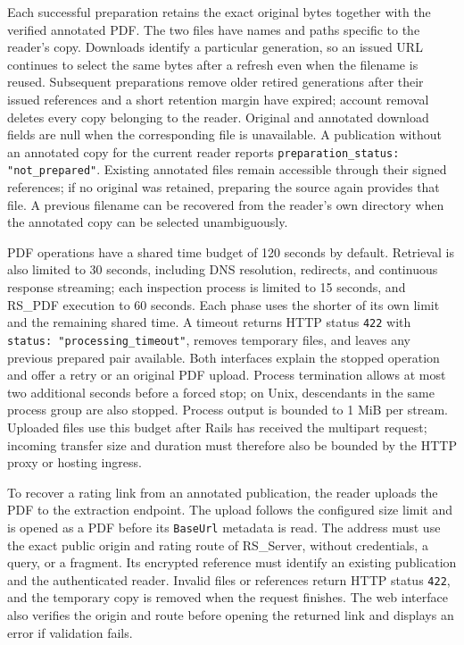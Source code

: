 \documentclass[a4paper, english]{article}
\newcommand{\rsserver}{RS\_Server\xspace}
\newcommand{\rspdf}{RS\_PDF\xspace}
\begin{document}
Each successful preparation retains the exact original bytes together with the verified annotated PDF. The two files have names and paths specific to the reader's copy. Downloads identify a particular generation, so an issued URL continues to select the same bytes after a refresh even when the filename is reused. Subsequent preparations remove older retired generations after their issued references and a short retention margin have expired; account removal deletes every copy belonging to the reader. Original and annotated download fields are null when the corresponding file is unavailable. A publication without an annotated copy for the current reader reports \verb|preparation_status: "not_prepared"|. Existing annotated files remain accessible through their signed references; if no original was retained, preparing the source again provides that file. A previous filename can be recovered from the reader's own directory when the annotated copy can be selected unambiguously.

PDF operations have a shared time budget of 120 seconds by default. Retrieval is also limited to 30 seconds, including DNS resolution, redirects, and continuous response streaming; each inspection process is limited to 15 seconds, and \rspdf execution to 60 seconds. Each phase uses the shorter of its own limit and the remaining shared time. A timeout returns HTTP status \verb|422| with \verb|status: "processing_timeout"|, removes temporary files, and leaves any previous prepared pair available. Both interfaces explain the stopped operation and offer a retry or an original PDF upload. Process termination allows at most two additional seconds before a forced stop; on Unix, descendants in the same process group are also stopped. Process output is bounded to 1 MiB per stream. Uploaded files use this budget after Rails has received the multipart request; incoming transfer size and duration must therefore also be bounded by the HTTP proxy or hosting ingress.

To recover a rating link from an annotated publication, the reader uploads the PDF to the extraction endpoint. The upload follows the configured size limit and is opened as a PDF before its \verb|BaseUrl| metadata is read. The address must use the exact public origin and rating route of \rsserver, without credentials, a query, or a fragment. Its encrypted reference must identify an existing publication and the authenticated reader. Invalid files or references return HTTP status \verb|422|, and the temporary copy is removed when the request finishes. The web interface also verifies the origin and route before opening the returned link and displays an error if validation fails.
\end{document}
